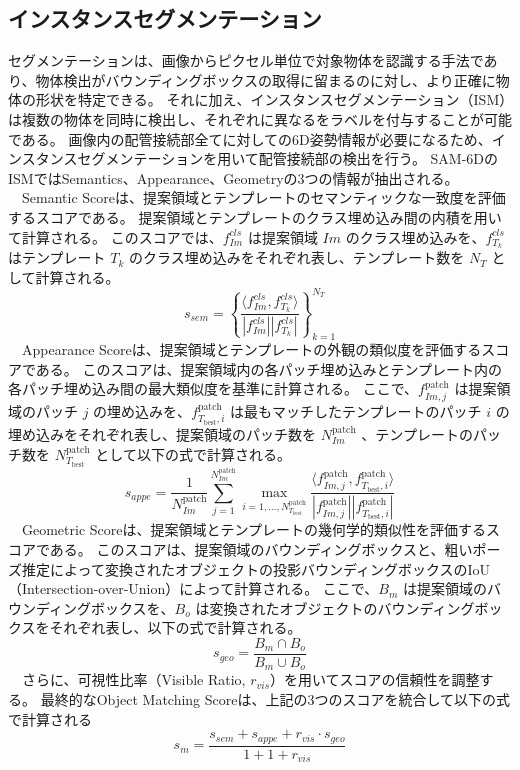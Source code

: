 \subsection{インスタンスセグメンテーション}
セグメンテーションは、画像からピクセル単位で対象物体を認識する手法であり、物体検出がバウンディングボックスの取得に留まるのに対し、より正確に物体の形状を特定できる。
それに加え、インスタンスセグメンテーション（ISM）は複数の物体を同時に検出し、それぞれに異なるをラベルを付与することが可能である。
画像内の配管接続部全てに対しての6D姿勢情報が必要になるため、インスタンスセグメンテーションを用いて配管接続部の検出を行う。
SAM-6DのISMではSemantics、Appearance、Geometryの3つの情報が抽出される。\\
　Semantic Scoreは、提案領域とテンプレートのセマンティックな一致度を評価するスコアである。
提案領域とテンプレートのクラス埋め込み間の内積を用いて計算される。
このスコアでは、$f^{cls}_{Im}$ は提案領域 $Im$ のクラス埋め込みを、$f^{cls}_{T_k}$ はテンプレート $T_k$ のクラス埋め込みをそれぞれ表し、テンプレート数を $N_T$ として計算される。
\[
s_{sem} = \left\{ \frac{\langle f^{cls}_{Im}, f^{cls}_{T_k} \rangle}{|f^{cls}_{Im}||f^{cls}_{T_k}|} \right\}_{k=1}^{N_T}
\]
　Appearance Scoreは、提案領域とテンプレートの外観の類似度を評価するスコアである。
このスコアは、提案領域内の各パッチ埋め込みとテンプレート内の各パッチ埋め込み間の最大類似度を基準に計算される。
ここで、$f^{\text{patch}}_{Im,j}$ は提案領域のパッチ $j$ の埋め込みを、$f^{\text{patch}}_{T_{\text{best}},i}$ は最もマッチしたテンプレートのパッチ $i$ の埋め込みをそれぞれ表し、提案領域のパッチ数を $N_{Im}^{\text{patch}}$ 、テンプレートのパッチ数を $N_{T_{\text{best}}}^{\text{patch}}$ として以下の式で計算される。
\[
s_{appe} = \frac{1}{N_{Im}^{\text{patch}}} \sum_{j=1}^{N_{Im}^{\text{patch}}} \max_{i=1, \dots, N_{T_{\text{best}}}^{\text{patch}}} \frac{\langle f^{\text{patch}}_{Im,j}, f^{\text{patch}}_{T_{\text{best}},i} \rangle}{|f^{\text{patch}}_{Im,j}| |f^{\text{patch}}_{T_{\text{best}},i}|}
\]
　Geometric Scoreは、提案領域とテンプレートの幾何学的類似性を評価するスコアである。
このスコアは、提案領域のバウンディングボックスと、粗いポーズ推定によって変換されたオブジェクトの投影バウンディングボックスのIoU（Intersection-over-Union）によって計算される。
ここで、$B_m$ は提案領域のバウンディングボックスを、$B_o$ は変換されたオブジェクトのバウンディングボックスをそれぞれ表し、以下の式で計算される。
\[
s_{geo} = \frac{B_m \cap B_o}{B_m \cup B_o}
\]
　さらに、可視性比率（Visible Ratio, $r_{vis}$）を用いてスコアの信頼性を調整する。
最終的なObject Matching Scoreは、上記の3つのスコアを統合して以下の式で計算される
\[
s_m = \frac{s_{sem} + s_{appe} + r_{vis} \cdot s_{geo}}{1 + 1 + r_{vis}}
\]


